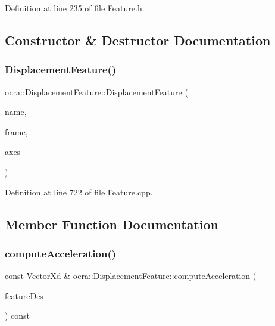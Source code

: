 Definition at line 235 of file Feature.\+h.



\subsection{Constructor \& Destructor Documentation}
\hypertarget{classocra_1_1DisplacementFeature_a9c48bb5ac5d4a856df9c2d879bc4b072}{}\label{classocra_1_1DisplacementFeature_a9c48bb5ac5d4a856df9c2d879bc4b072} 
\subsubsection{\texorpdfstring{Displacement\+Feature()}{DisplacementFeature()}}
{\footnotesize\ttfamily ocra\+::\+Displacement\+Feature\+::\+Displacement\+Feature (\begin{DoxyParamCaption}\item[{const std\+::string \&}]{name,  }\item[{Control\+Frame\+::\+Ptr}]{frame,  }\item[{\hyperlink{namespaceocra_a436781c7059a0f76027df1c652126260}{E\+Cartesian\+Dof}}]{axes }\end{DoxyParamCaption})}



Definition at line 722 of file Feature.\+cpp.



\subsection{Member Function Documentation}
\hypertarget{classocra_1_1DisplacementFeature_a622cd1b7305b26fbbb2f78784fd0ebf0}{}\label{classocra_1_1DisplacementFeature_a622cd1b7305b26fbbb2f78784fd0ebf0} 
\subsubsection{\texorpdfstring{compute\+Acceleration()}{computeAcceleration()}\hspace{0.1cm}{\footnotesize\ttfamily [1/2]}}
{\footnotesize\ttfamily const Vector\+Xd \& ocra\+::\+Displacement\+Feature\+::compute\+Acceleration (\begin{DoxyParamCaption}\item[{const \hyperlink{classocra_1_1Feature}{Feature} \&}]{feature\+Des }\end{DoxyParamCaption}) const\hspace{0.3cm}{\ttfamily [virtual]}}




